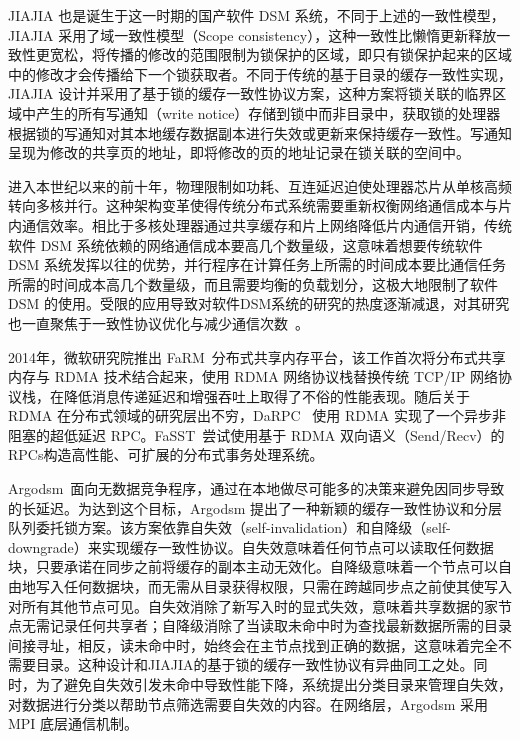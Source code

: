 {JIAJIA 也是诞生于这一时期的国产软件 DSM 系统，不同于上述的一致性模型，JIAJIA 采用了域一致性模型（Scope consistency），这种一致性比懒惰更新释放一致性更宽松，将传播的修改的范围限制为锁保护的区域，即只有锁保护起来的区域中的修改才会传播给下一个锁获取者。不同于传统的基于目录的缓存一致性实现，JIAJIA 设计并采用了基于锁的缓存一致性协议方案，这种方案将锁关联的临界区域中产生的所有写通知（write notice）存储到锁中而非目录中，获取锁的处理器根据锁的写通知对其本地缓存数据副本进行失效或更新来保持缓存一致性。写通知呈现为修改的共享页的地址，即将修改的页的地址记录在锁关联的空间中。

进入本世纪以来的前十年，物理限制如功耗、互连延迟迫使处理器芯片从单核高频转向多核并行。这种架构变革使得传统分布式系统需要重新权衡网络通信成本与片内通信效率。相比于多核处理器通过共享缓存和片上网络降低片内通信开销，传统软件 DSM 系统依赖的网络通信成本要高几个数量级，这意味着想要传统软件 DSM 系统发挥以往的优势，并行程序在计算任务上所需的时间成本要比通信任务所需的时间成本高几个数量级，而且需要均衡的负载划分，这极大地限制了软件 DSM 的使用。受限的应用导致对软件DSM系统的研究的热度逐渐减退，对其研究也一直聚焦于一致性协议优化与减少通信次数~\citep{Cheung1999AMP, abe2003movinghomedsm}。

2014年，微软研究院推出 FaRM~\citep{drago2014farm}分布式共享内存平台，该工作首次将分布式共享内存与 RDMA 技术结合起来，使用 RDMA 网络协议栈替换传统 TCP/IP 网络协议栈，在降低消息传递延迟和增强吞吐上取得了不俗的性能表现。随后关于 RDMA 在分布式领域的研究层出不穷，DaRPC~\citep{stuedi2014DaRPC} 使用 RDMA 实现了一个异步非阻塞的超低延迟 RPC。FaSST~\citep{kalia2016fasst}尝试使用基于 RDMA 双向语义（Send/Recv）的RPCs构造高性能、可扩展的分布式事务处理系统。

Argodsm~\citep{kaxiras2015argodsm}面向无数据竞争程序，通过在本地做尽可能多的决策来避免因同步导致的长延迟。为达到这个目标，Argodsm 提出了一种新颖的缓存一致性协议和分层队列委托锁方案。该方案依靠自失效（self-invalidation）和自降级（self-downgrade）来实现缓存一致性协议。自失效意味着任何节点可以读取任何数据块，只要承诺在同步之前将缓存的副本主动无效化。自降级意味着一个节点可以自由地写入任何数据块，而无需从目录获得权限，只需在跨越同步点之前使其使写入对所有其他节点可见。自失效消除了新写入时的显式失效，意味着共享数据的家节点无需记录任何共享者；自降级消除了当读取未命中时为查找最新数据所需的目录间接寻址，相反，读未命中时，始终会在主节点找到正确的数据，这意味着完全不需要目录。这种设计和JIAJIA的基于锁的缓存一致性协议有异曲同工之处。同时，为了避免自失效引发未命中导致性能下降，系统提出分类目录来管理自失效，对数据进行分类以帮助节点筛选需要自失效的内容。在网络层，Argodsm 采用 MPI 底层通信机制。

}
